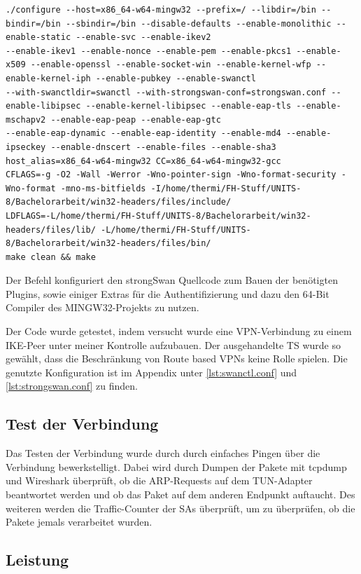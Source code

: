 {\begin{lstlisting}[caption=./configure und make]
./configure --host=x86_64-w64-mingw32 --prefix=/ --libdir=/bin --bindir=/bin --sbindir=/bin --disable-defaults --enable-monolithic --enable-static --enable-svc --enable-ikev2 
--enable-ikev1 --enable-nonce --enable-pem --enable-pkcs1 --enable-x509 --enable-openssl --enable-socket-win --enable-kernel-wfp --enable-kernel-iph --enable-pubkey --enable-swanctl 
--with-swanctldir=swanctl --with-strongswan-conf=strongswan.conf --enable-libipsec --enable-kernel-libipsec --enable-eap-tls --enable-mschapv2 --enable-eap-peap --enable-eap-gtc 
--enable-eap-dynamic --enable-eap-identity --enable-md4 --enable-ipseckey --enable-dnscert --enable-files --enable-sha3 host_alias=x86_64-w64-mingw32 CC=x86_64-w64-mingw32-gcc 
CFLAGS=-g -O2 -Wall -Werror -Wno-pointer-sign -Wno-format-security -Wno-format -mno-ms-bitfields -I/home/thermi/FH-Stuff/UNITS-8/Bachelorarbeit/win32-headers/files/include/ 
LDFLAGS=-L/home/thermi/FH-Stuff/UNITS-8/Bachelorarbeit/win32-headers/files/lib/ -L/home/thermi/FH-Stuff/UNITS-8/Bachelorarbeit/win32-headers/files/bin/
make clean && make
\end{lstlisting}


Der Befehl konfiguriert den strongSwan Quellcode zum Bauen der benötigten Plugins, sowie einiger
Extras für die Authentifizierung und dazu den 64-Bit Compiler des MINGW32-Projekts zu nutzen.

Der Code wurde getestet, indem versucht wurde eine VPN-Verbindung zu einem \ac{IKE}-Peer
unter meiner Kontrolle aufzubauen. Der ausgehandelte \ac{TS} wurde so gewählt, dass
die Beschränkung von Route based VPNs keine Rolle spielen.
Die genutzte Konfiguration ist im Appendix unter \autoref{lst:swanctl.conf}
und \autoref{lst:strongswan.conf} zu finden.

\subsection{Test der Verbindung}
Das Testen der Verbindung wurde durch durch einfaches Pingen über die Verbindung bewerkstelligt.
Dabei wird durch Dumpen der Pakete mit tcpdump und Wireshark überprüft, ob die
\ac{ARP}-Requests auf dem TUN-Adapter beantwortet werden und ob das Paket auf dem
anderen Endpunkt auftaucht. Des weiteren werden die Traffic-Counter der \acp{SA} überprüft,
um zu überprüfen, ob die Pakete jemals verarbeitet wurden.

\subsection{Leistung}

}
